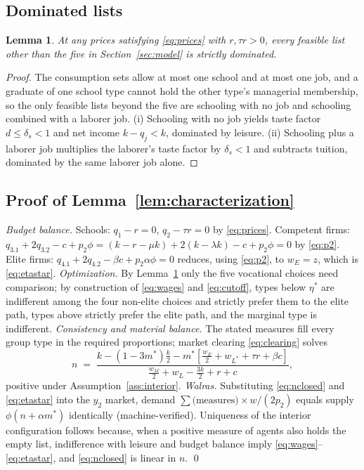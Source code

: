 \documentclass[12pt,letterpaper]{article}
\newtheorem{lemma}{Lemma}
\theoremstyle{definition}
\begin{document}
\subsection{Dominated lists}
\begin{lemma}\label{lem:dominated} At any prices satisfying \eqref{eq:prices} with $r,\tau r>0$, every feasible list other than the five in Section~\ref{sec:model} is strictly dominated.
\end{lemma}

\begin{proof}
The consumption sets allow at most one school and at most one job, and a graduate of one school type cannot hold the other type's managerial membership, so the only feasible lists beyond the five are schooling with no job and schooling combined with a laborer job.
(i) Schooling with no job yields taste factor $d\leq\delta_s<1$ and net income $k-q_j<k$, dominated by leisure.
(ii) Schooling plus a laborer job multiplies the laborer's taste factor by $\delta_s<1$ and subtracts tuition, dominated by the same laborer job alone.
\end{proof}

\subsection{Proof of Lemma~\ref{lem:characterization}}
\emph{Budget balance.}
Schools: $q_1-r=0$, $q_2-\tau r=0$ by \eqref{eq:prices}.
Competent firms: $q_{3.1}+2q_{3.2} - c + p_2\phi = (k-r-\mu k) + 2(k-\lambda k) - c + p_2\phi = 0$ by \eqref{eq:p2}.
Elite firms: $q_{4.1}+2q_{4.2} - \beta c + p_2\alpha\phi = 0$ reduces, using \eqref{eq:p2}, to $w_E = z$, which is \eqref{eq:etastar}.
\emph{Optimization.}
By Lemma~\ref{lem:dominated} only the five vocational choices need comparison; by construction of \eqref{eq:wages} and \eqref{eq:cutoff}, types below $\eta^\ast$ are indifferent among the four non-elite choices and strictly prefer them to the elite path, types above strictly prefer the elite path, and the marginal type is indifferent.
\emph{Consistency and material balance.}
The stated measures fill every group type in the required proportions; market clearing \eqref{eq:clearing} solves
\begin{equation}\label{eq:nclosed}
  n \;=\; \frac{k - (1-3m^\ast)\frac{k}{2} - m^\ast\left[\frac{w_E}{2} +
  w_{L^\ast} + \tau r + \beta c\right]}
  {\frac{w_M}{2} + w_L - \frac{3k}{2} + r + c},
\end{equation}
positive under Assumption~\ref{ass:interior}.
\emph{Walras.}
Substituting \eqref{eq:nclosed} and \eqref{eq:etastar} into the $y_2$ market, demand $\sum \text{(measures)}\times w/(2p_2)$ equals supply $\phi(n+\alpha m^\ast)$ identically (machine-verified).
Uniqueness of the interior configuration follows because, when a positive measure of agents also holds the empty list, indifference with leisure and budget balance imply \eqref{eq:wages}--\eqref{eq:etastar}, and \eqref{eq:nclosed} is linear in $n$.
\qed
\end{document}
